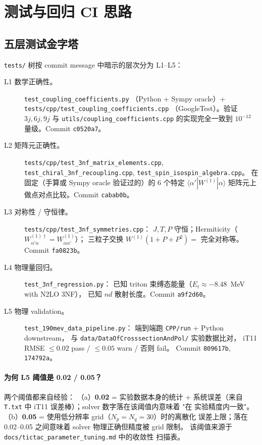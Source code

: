 \section{测试与回归 CI 思路}
\label{sec:19:tests}

\subsection{五层测试金字塔}

\texttt{tests/} 树按 commit message 中暗示的层次分为 L1--L5：

\begin{description}
\item[L1 数学正确性。] \texttt{test\_coupling\_coefficients.py}
      （Python + Sympy oracle）+ \texttt{tests/cpp/test\_coupling\_coefficients.cpp}
      （GoogleTest）。验证 $3j, 6j, 9j$ 与
      \texttt{utils/coupling\_coefficients.cpp} 的实现完全一致到
      $10^{-12}$ 量级。Commit \texttt{c0520a7}。
\item[L2 矩阵元正确性。] \texttt{tests/cpp/test\_3nf\_matrix\_elements.cpp},
      \texttt{test\_chiral\_3nf\_recoupling.cpp}, \texttt{test\_spin\_isospin\_algebra.cpp}。
      在固定（手算或 Sympy oracle 验证过的）的 6 个特定 $\langle\alpha'|W^{(1)}|\alpha\rangle$
      矩阵元上做点对点比较。Commit \texttt{cabab0b}。
\item[L3 对称性 / 守恒律。] \texttt{tests/cpp/test\_3nf\_symmetries.cpp}：
      $J, T, P$ 守恒；Hermiticity（$W^{(1)\dagger}_{\alpha'\alpha} = W^{(1)}_{\alpha\alpha'}$）；
      三粒子交换 $W^{(1)}(1+P+P^2) = $ 完全对称等。Commit \texttt{fa0823b}。
\item[L4 物理量回归。] \texttt{test\_3nf\_regression.py}：
      已知 triton 束缚态能量（$E_t \approx -8.48$~MeV with N2LO 3NF），
      已知 $nd$ 散射长度。Commit \texttt{a9f2d60}。
\item[L5 物理 validation。] \texttt{test\_190mev\_data\_pipeline.py}：
      端到端跑 \texttt{CPP/run} + Python downstream，
      与 \texttt{data/DataOfCrosssectionAndPol/} 实验数据比对，
      iT11 RMSE $\le 0.02$ pass / $\le 0.05$ warn / 否则 fail。
      Commit \texttt{809617b}, \texttt{174792a}。
\end{description}

\paragraph{为何 L5 阈值是 0.02 / 0.05？}
%
两个阈值都来自经验：
%
（a）\textbf{0.02} = 实验数据本身的统计 + 系统误差（来自
\texttt{T.txt} 中 iT11 误差棒）；solver 数字落在该阈值内意味着 "在
实验精度内一致"。
%
（b）\textbf{0.05} = 使用低分辨率 grid（$N_p = N_q = 30$）时的离散化
误差上限；落在 0.02--0.05 之间意味着 solver 物理正确但精度被 grid 限制。
该阈值来源于 \texttt{docs/tictac\_parameter\_tuning.md} 中的收敛性
扫描表。

